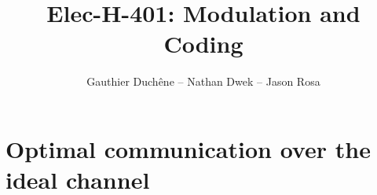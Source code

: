 

\title{Elec-H-401: Modulation and Coding}
\author{Gauthier Duchêne -- Nathan Dwek -- Jason Rosa}
\date{}


\maketitle
\tableofcontents
\clearpage
\hypersetup{allcolors = link}

\section{Optimal communication over the ideal channel}




